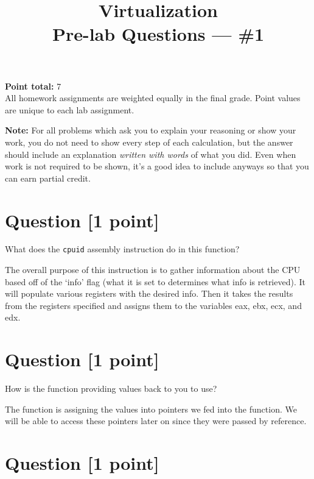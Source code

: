 \documentclass[11pt]{article}
\providecommand{\due}{}
\begin{document}
\title{Virtualization\\Pre-lab Questions --- \#1}
\date{\due}

\maketitle

\noindent \textbf{Point total:} 7
\\ All homework assignments are weighted equally in the final grade. Point values are unique to each lab assignment.

\textbf{Note:} For all problems which ask you to explain your reasoning or show your work, you do not need to show every step of each calculation, but the answer should include an explanation \emph{written with words} of what you did.  Even when work is not required to be shown, it’s a good idea to include anyways so that you can earn partial credit.

\section{Question [1 point]}

What does the \texttt{cpuid} assembly instruction do in this function?

\begin{solution}
The overall purpose of this instruction is to gather information about the CPU based off of the `info' flag 
(what it is set to determines what info is retrieved). It will populate various registers with the 
desired info. Then it takes the results from the 
registers specified and assigns them to the variables eax, ebx, ecx, and edx. 
\end{solution}


\section{Question [1 point]}

How is the function providing values back to you to use?

\begin{solution}
The function is assigning the values into pointers we fed into the function. We will be able to 
access these pointers later on since they were passed by reference. 
\end{solution}


\section{Question [1 point]}
\end{document}
